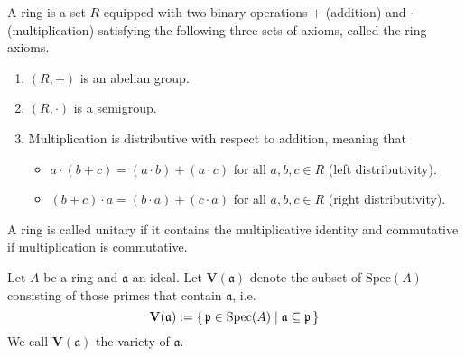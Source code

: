 \begin{defn}[Ring]
    A ring is a set \(R\) equipped with two binary operations \(+\) (addition) and \(\cdot\) (multiplication) satisfying the following three sets of axioms, called the ring axioms.
    \begin{enumerate}
      \item \((R, +)\) is an abelian group.
      \item \((R, \cdot)\) is a semigroup.
      \item Multiplication is distributive with respect to addition, meaning that
      \begin{itemize}
        \item \(a \cdot (b + c) = (a \cdot b) + (a \cdot c)\) for all \(a, b, c \in R\) (left distributivity).
        \item \((b + c) \cdot a = (b \cdot a) + (c \cdot a)\) for all \(a, b, c \in R\) (right distributivity).
      \end{itemize}
    \end{enumerate}
    A ring is called unitary if it contains the multiplicative identity and commutative if multiplication is commutative.
\end{defn}

\begin{defn}[Ideal]
    
\end{defn}

\begin{defn}
    
\end{defn}

\begin{defn}
    
\end{defn}

\begin{defn}
    
\end{defn}

\begin{defn}[Spectrum]
    
\end{defn}

\begin{defn}
    Let \(A\) be a ring and \(\mathfrak{a}\) an ideal. Let \(\mathbf{V}(\mathfrak{a})\) denote the subset of \(\mathrm{Spec}(A)\) consisting of those primes that contain \(\mathfrak{a}\), i.e.
    \begin{equation}
        \mathbf{V}(\mathfrak{a}) := \left\{\, \mathfrak{p} \in \mathrm{Spec}(A) \mathrel{\mid} \mathfrak{a} \subseteq \mathfrak{p} \,\right\}
    \end{equation}
    We call \(\mathbf{V}(\mathfrak{a})\) the variety of \(\mathfrak{a}\).
\end{defn}


